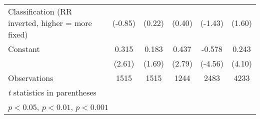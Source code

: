{\begin{tabular}{l*{5}{c}}
Classification (RR inverted, higher = more fixed)&  (-0.85)         &   (0.22)         &   (0.40)         &  (-1.43)         &   (1.60)         \\
\addlinespace
Constant                                &    0.315\sym{*}  &    0.183         &    0.437\sym{**} &   -0.578\sym{***}&    0.243\sym{***}\\
                                        &   (2.61)         &   (1.69)         &   (2.79)         &  (-4.56)         &   (4.10)         \\
\midrule
Observations                            &     1515         &     1515         &     1244         &     2483         &     4233         \\
\bottomrule
\multicolumn{6}{l}{\footnotesize \textit{t} statistics in parentheses}\\
\multicolumn{6}{l}{\footnotesize \sym{*} \(p<0.05\), \sym{**} \(p<0.01\), \sym{***} \(p<0.001\)}\\
\end{tabular}
}
